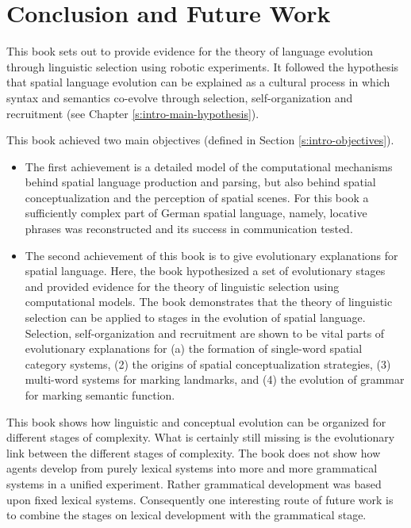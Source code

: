 %

\chapter{Conclusion and Future Work}

This book sets out to provide evidence for the theory
of language evolution through linguistic selection using robotic experiments. 
It followed the hypothesis that spatial language evolution can be explained 
as a cultural process in which syntax and semantics co-evolve through
selection, self-organization and recruitment (see Chapter \ref{s:intro-main-hypothesis}).

This book achieved two main objectives (defined  in Section \ref{s:intro-objectives}). 
\begin{itemize}
\item The first achievement is a detailed  model of the computational mechanisms behind 
spatial language production and parsing, but also behind spatial conceptualization
and the perception of spatial scenes. For this book a sufficiently complex 
part of German spatial language, namely, locative phrases was reconstructed and
its success in communication tested. 
\item The second achievement of this book is to give evolutionary explanations for spatial 
language. Here, the book hypothesized a set of evolutionary stages and provided
evidence for the theory of linguistic selection using computational models. 
The book demonstrates that the theory of linguistic selection can be applied 
to stages in the evolution of spatial language. Selection, self-organization and recruitment
are shown to be vital parts of evolutionary explanations for (a) the formation of single-word 
spatial category systems, (2) the origins of spatial conceptualization strategies, (3) 
multi-word systems for marking landmarks, and (4) the evolution of grammar for 
marking semantic function.
\end{itemize}
This book shows how linguistic and conceptual evolution can 
be organized for different stages of complexity. What is certainly still missing 
is the evolutionary link between the different stages of complexity. 
The book does not show how agents develop from purely lexical systems
into more and more grammatical systems in a unified experiment.
Rather grammatical development was based upon fixed lexical systems.
Consequently one interesting route of future work is to combine the stages on lexical
development with the grammatical stage.

